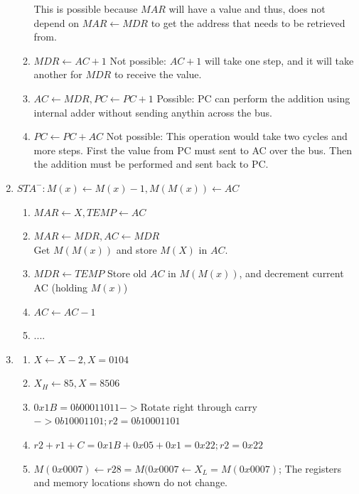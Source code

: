 \documentclass{article}
\begin{document}
\begin{enumerate}
\begin{enumerate}
        This is possible because $MAR$ will have a value and thus, does not depend on $MAR \leftarrow MDR$ to get the address that needs to be retrieved from.
      \item $MDR \leftarrow AC + 1$
        Not possible: $AC+1$ will take one step, and it will take another for $MDR$ to receive the value.
      \item $AC \leftarrow MDR, PC \leftarrow PC + 1$
        Possible: PC can perform the addition using internal adder without sending anythin across the bus.
      \item $PC \leftarrow PC + AC$
        Not possible:  This operation would take two cycles and more steps.  First the value from PC must sent to AC over the bus.  Then the addition must be performed and sent back to PC.
    \end{enumerate}
    \item $STA^{-}: M(x) \leftarrow M(x) - 1, M(M(x)) \leftarrow AC$
    \begin{enumerate}
      \item $MAR \leftarrow X, TEMP \leftarrow AC$
      \item $MAR \leftarrow MDR, AC \leftarrow MDR$\\
      Get $M(M(x))$ and store $M(X)$ in $AC$.
      \item $MDR \leftarrow TEMP$
      Store old $AC$ in $M(M(x))$, and decrement current AC (holding $M(x)$)
      \item $AC \leftarrow AC - 1$
      \item ....
    \end{enumerate}
    \item\begin{enumerate}
      \item $X \leftarrow X -2, X = 0104$
      \item $X_{H} \leftarrow 85, X = 8506$
      \item $0x1B = 0b 0001 1011 -> $Rotate right through carry$ -> 0b 1000 1101; r2 = 0b10001101$
      \item $r2 + r1 + C = 0x1B + 0x05 + 0x1 = 0x22; r2 = 0x22$
      \item $M(0x0007) \leftarrow r28 = M(0x0007 \leftarrow X_L = M(0x0007)$; The registers and memory locations shown do not change.
    \end{enumerate}
  \end{enumerate}
\end{document}
